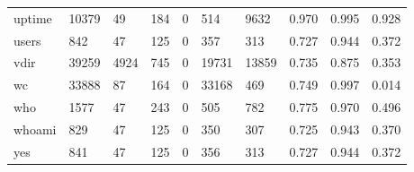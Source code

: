 \begin{longtable}{lp{2.0cm}p{2.0cm}p{2.0cm}p{2.0cm}p{2.0cm}p{2.0cm}p{2.0cm}p{2.0cm}p{2.0cm}}
uptime    &                  10379 &                                 49 &                               184 &                                0 &                               514 &                            9632 &                                   0.970 &                                  0.995 &                                0.928 \\
users     &                    842 &                                 47 &                               125 &                                0 &                               357 &                             313 &                                   0.727 &                                  0.944 &                                0.372 \\
vdir      &                  39259 &                               4924 &                               745 &                                0 &                             19731 &                           13859 &                                   0.735 &                                  0.875 &                                0.353 \\
wc        &                  33888 &                                 87 &                               164 &                                0 &                             33168 &                             469 &                                   0.749 &                                  0.997 &                                0.014 \\
who       &                   1577 &                                 47 &                               243 &                                0 &                               505 &                             782 &                                   0.775 &                                  0.970 &                                0.496 \\
whoami    &                    829 &                                 47 &                               125 &                                0 &                               350 &                             307 &                                   0.725 &                                  0.943 &                                0.370 \\
yes       &                    841 &                                 47 &                               125 &                                0 &                               356 &                             313 &                                   0.727 &                                  0.944 &                                0.372 \\
\end{longtable}
